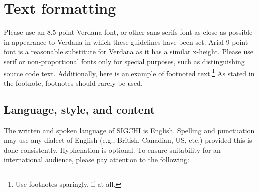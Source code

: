 \documentclass{chi-ext}
\begin{document}
\section{Text formatting}
Please use an 8.5-point Verdana font, or other sans serifs font as close as possible in appearance to Verdana in which these guidelines have been set. 
Arial 9-point font is a reasonable substitute for Verdana as it has a similar x-height. 
Please use serif or non-proportional fonts only for special purposes, such as distinguishing source code text.
Additionally, here is an example of footnoted text.\footnote{Use footnotes sparingly, if at all.}
As stated in the footnote, footnotes should rarely be used.

\subsection{Language, style, and content}
The written and spoken language of SIGCHI is English. 
Spelling and punctuation may use any dialect of English (e.g., British, Canadian, US, etc.) provided this is done consistently. 
Hyphenation is optional. 
To ensure suitability for an international audience, please pay attention to the following:
\end{document}
